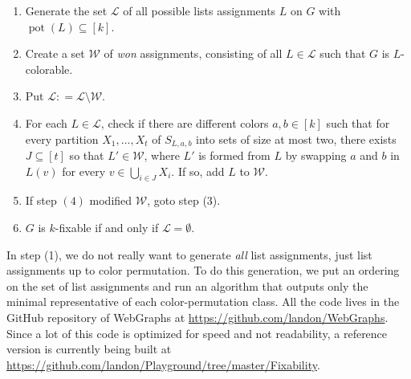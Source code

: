 \documentclass[12pt]{article}
\theoremstyle{plain}
\theoremstyle{definition}
\theoremstyle{remark}
\newcommand{\irange}[1]{\left[#1\right]}
\newcommand{\DefinedAs}{\mathrel{\mathop:}=}
\newcommand{\pot}{\operatorname{pot}}
\begin{document}
\begin{enumerate}
	\item Generate the set $\mathcal{L}$ of all possible lists assignments $L$ on $G$ with $\pot{(L) \subseteq \irange{k}}$.
	\item Create a set $\mathcal{W}$ of \emph{won} assignments, consisting of all $L \in \mathcal{L}$ such that $G$ is $L$-colorable.
	\item Put $\mathcal{L} \DefinedAs \mathcal{L} \setminus \mathcal{W}$.
	\item For each $L \in \mathcal{L}$, check if there are different colors $a,b \in \irange{k}$ such that for every partition
	$X_1, \ldots, X_t$ of $S_{L,a,b}$ into sets of size at most two, there exists $J
	\subseteq \irange{t}$ so that $L' \in \mathcal{W}$, where $L'$ is formed
	from $L$ by swapping $a$ and $b$ in $L(v)$ for every $v \in \bigcup_{i \in J} X_i$.  If so, add $L$ to $\mathcal{W}$.
	\item If step $(4)$ modified $\mathcal{W}$, goto step (3).
	\item $G$ is $k$-fixable if and only if $\mathcal{L} = \emptyset$.
\end{enumerate}

In step (1), we do not really want to generate \emph{all} list assignments, just list assignments up to color permutation.  To do this generation, we put an ordering on the set of list assignments and run an algorithm that outputs only the minimal representative of each color-permutation class.  All the code lives in the GitHub repository of WebGraphs at \url{https://github.com/landon/WebGraphs}.   Since a lot of this code is optimized for speed and not readability, a reference version is currently being built at \url{https://github.com/landon/Playground/tree/master/Fixability}.
\end{document}
